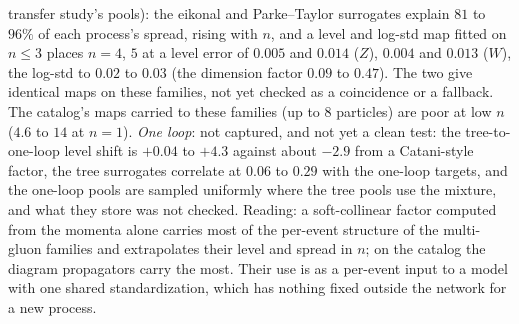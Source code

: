 \documentclass[11pt]{article}
\begin{document}
transfer study's pools): the eikonal and Parke--Taylor surrogates explain $81$ to $96\%$ of each process's spread, rising
with $n$, and a level and log-std map fitted on $n\le3$ places $n=4$, $5$ at a level error of $0.005$ and $0.014$ ($Z$),
$0.004$ and $0.013$ ($W$), the log-std to $0.02$ to $0.03$ (the dimension factor $0.09$ to $0.47$). The two give identical
maps on these families, not yet checked as a coincidence or a fallback. The catalog's maps carried to these families
(up to $8$ particles) are poor at low $n$ ($4.6$ to $14$ at $n=1$). \emph{One loop}: not captured, and not yet a clean
test: the tree-to-one-loop level shift is $+0.04$ to $+4.3$ against about $-2.9$ from a Catani-style factor, the tree
surrogates correlate at $0.06$ to $0.29$ with the one-loop targets, and the one-loop pools are sampled uniformly where the
tree pools use the mixture, and what they store was not checked. Reading: a soft-collinear factor computed from the
momenta alone carries most of the per-event structure of the multi-gluon families and extrapolates their level and
spread in $n$; on the catalog the diagram propagators carry the most. Their use is as a per-event input to a model with
one shared standardization, which has nothing fixed outside the network for a new process.
\end{document}
